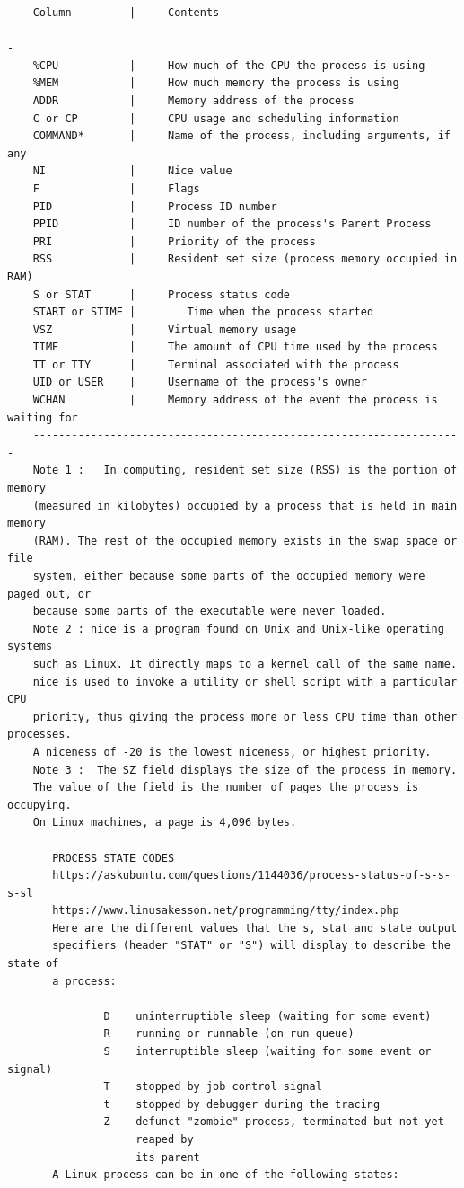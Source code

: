 \documentclass[a4paper,12pt]{article}
\begin{document}
\begin{verbatim}
    Column         |     Contents
    -------------------------------------------------------------------
    %CPU           |     How much of the CPU the process is using
    %MEM           |     How much memory the process is using
    ADDR           |     Memory address of the process
    C or CP        |     CPU usage and scheduling information
    COMMAND*       |     Name of the process, including arguments, if any
    NI             |     Nice value
    F              |     Flags
    PID            |     Process ID number
    PPID           |     ID number of the process's Parent Process
    PRI            |     Priority of the process
    RSS            |     Resident set size (process memory occupied in RAM)
    S or STAT      |     Process status code
    START or STIME |	    Time when the process started
    VSZ            |     Virtual memory usage
    TIME           |     The amount of CPU time used by the process
    TT or TTY      |     Terminal associated with the process
    UID or USER    |     Username of the process's owner
    WCHAN          |     Memory address of the event the process is waiting for    
    -------------------------------------------------------------------
    Note 1 :   In computing, resident set size (RSS) is the portion of memory 
    (measured in kilobytes) occupied by a process that is held in main memory 
    (RAM). The rest of the occupied memory exists in the swap space or file 
    system, either because some parts of the occupied memory were paged out, or 
    because some parts of the executable were never loaded.    
    Note 2 : nice is a program found on Unix and Unix-like operating systems
    such as Linux. It directly maps to a kernel call of the same name. 
    nice is used to invoke a utility or shell script with a particular CPU
    priority, thus giving the process more or less CPU time than other processes.  
    A niceness of -20 is the lowest niceness, or highest priority. 
    Note 3 :  The SZ field displays the size of the process in memory.
    The value of the field is the number of pages the process is occupying. 
    On Linux machines, a page is 4,096 bytes.
    
       PROCESS STATE CODES 
       https://askubuntu.com/questions/1144036/process-status-of-s-s-s-sl
       https://www.linusakesson.net/programming/tty/index.php
       Here are the different values that the s, stat and state output
       specifiers (header "STAT" or "S") will display to describe the state of
       a process:

               D    uninterruptible sleep (waiting for some event)
               R    running or runnable (on run queue)
               S    interruptible sleep (waiting for some event or signal)
               T    stopped by job control signal
               t    stopped by debugger during the tracing
               Z    defunct "zombie" process, terminated but not yet
                    reaped by 
                    its parent
       A Linux process can be in one of the following states:       
       

\end{verbatim}
\end{document}
